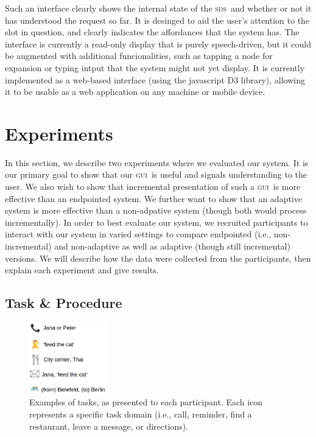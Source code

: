 \documentclass[11pt]{article}
\newcommand{\sds}[0]{\textsc{sds}}
\newcommand{\ui}[0]{\textsc{gui}}
\begin{document}
Such an interface clearly shows the internal state of the \sds\ and whether or not it has understood the request so far. It is desinged to aid the user's attention to the slot in question, and clearly indicates the affordances that the system has. The interface is currently a read-only display that is purely speech-driven, but it could be augmented with additional funcionalities, such as tapping a node for expansion or typing intput that the system might not yet display. It is currently implemented as a web-based interface (using the javascript D3 library), allowing it to be usable as a web application on any machine or mobile device. 


\section{Experiments}
\label{section:experiments}

In this section, we describe two experiments where we evaluated our system. It is our primary goal to show that our \ui\ is useful and signals understanding to the user. We also wish to show that incremental presentation of such a \ui\ is more effective than an endpointed system. We further want to show that an adaptive system is more effective than a non-adpative system (though both would process incrementally). In order to best evaluate our system, we recruited participants to interact with our system in varied settings to compare endpointed (i.e., non-incremental) and non-adaptive as well as adaptive (though still incremental) versions. We will describe how the data were collected from the participants, then explain each experiment and give results.

\subsection{Task \& Procedure} 


\begin{figure}
  \centering
      \includegraphics[width=0.3\textwidth]{figures/taskexample.png}	
      \caption{Examples of tasks, as presented to each participant. Each icon represents a specific task domain (i.e., call, reminder, find a restaurant, leave a message, or directions).\label{fig:taskex}}
\end{figure}
\end{document}
